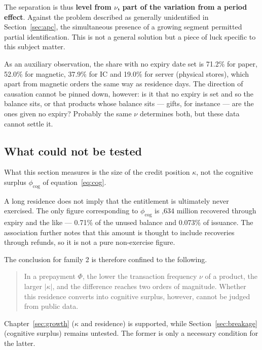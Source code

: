 The separation is thus \textbf{level from $\nu$, part of the variation from a period effect}.
Against the problem described as generally unidentified in Section~\ref{sec:apc}, the simultaneous
presence of a growing segment permitted partial identification. This is not a general solution
but a piece of luck specific to this subject matter.

As an auxiliary observation, the share with no expiry date set is 71.2\% for paper, 52.0\% for
magnetic, 37.9\% for IC and 19.0\% for server (physical stores), which apart from magnetic orders
the same way as residence days. The direction of causation cannot be pinned down, however: is it
that no expiry is set and so the balance sits, or that products whose balance sits — gifts, for
instance — are the ones given no expiry? Probably the same $\nu$ determines both, but these data
cannot settle it.

\subsection{What could not be tested}

\begin{proposition}
What this section measures is the size of the credit position $\kappa$, not the cognitive surplus
$\phi_{\mathrm{cog}}$ of equation~\eqref{eq:cog}.
\end{proposition}

A long residence does not imply that the entitlement is ultimately never exercised. The only
figure corresponding to $\phi_{\mathrm{cog}}$ is ,634 million recovered through expiry
and the like — 0.71\% of the unused balance and 0.073\% of issuance. The association further
notes that this amount is thought to include recoveries through refunds, so it is not a pure
non-exercise figure.

The conclusion for family 2 is therefore confined to the following.

\begin{quote}
In a prepayment $\Phi$, the lower the transaction frequency $\nu$ of a product, the larger
$|\kappa|$, and the difference reaches two orders of magnitude. Whether this residence converts
into cognitive surplus, however, cannot be judged from public data.
\end{quote}

Chapter~\ref{sec:growth} ($\kappa$ and residence) is supported, while
Section~\ref{sec:breakage} (cognitive surplus) remains untested. The former is only a necessary
condition for the latter.

